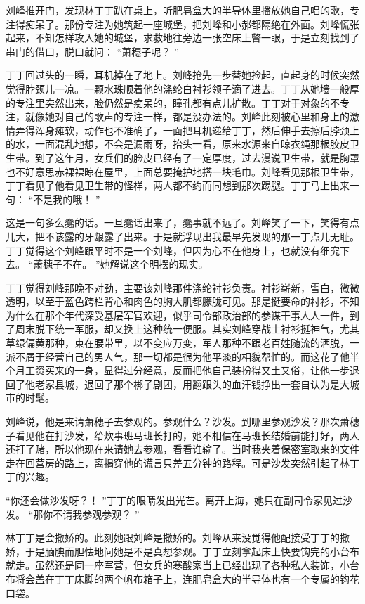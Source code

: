 \documentclass[12pt,twoside,openany]{book}
\begin{document}
刘峰推开门，发现林丁丁趴在桌上，听肥皂盒大的半导体里播放她自己唱的歌，专注得痴呆了。那份专注为她筑起一座城堡，把刘峰和小郝都隔绝在外面。刘峰慌张起来，不知怎样攻入她的城堡，求救地往旁边一张空床上瞥一眼，于是立刻找到了串门的借口，脱口就问： “萧穗子呢？ ”

丁丁回过头的一瞬，耳机掉在了地上。刘峰抢先一步替她捡起，直起身的时候突然觉得脖颈儿一凉。一颗水珠顺着他的涤纶白衬衫领子滴了进去。丁丁从她墙一般厚的专注里突然出来，脸仍然是痴呆的，瞳孔都有点儿扩散。丁丁对于对象的不专注，就像她对自己的歌声的专注一样，都是没办法的。刘峰此刻被心里和身上的激情弄得浑身瘫软，动作也不准确了，一面把耳机递给丁丁，然后伸手去擦后脖颈上的水，一面混乱地想，不会是漏雨呀，抬头一看，原来水源来自晾衣绳那根胶皮卫生带。到了这年月，女兵们的脸皮已经有了一定厚度，过去漫说卫生带，就是胸罩也不好意思赤裸裸晾在屋里，上面总要掩护地搭一块毛巾。刘峰看见那根卫生带，丁丁看见了他看见卫生带的怪样，两人都不约而同想到那次踢腿。丁丁马上出来一句： “不是我的哦！ ”

这是一句多么蠢的话。一旦蠢话出来了，蠢事就不远了。刘峰笑了一下，笑得有点儿大，把不该露的牙龈露了出来。于是就浮现出我最早先发现的那一丁点儿无耻。丁丁觉得这个刘峰跟平时不是一个刘峰，但因为心不在他身上，也就没有细究下去。 “萧穗子不在。 ”她解说这个明摆的现实。

丁丁觉得刘峰那晚不对劲，主要该刘峰那件涤纶衬衫负责。衬衫崭新，雪白，微微透明，以至于蓝色跨栏背心和肉色的胸大肌都朦胧可见。那是挺要命的衬衫，不知为什么在那个年代深受基层军官欢迎，似乎司令部政治部的参谋干事人人一件，到了周末脱下统一军服，却又换上这种统一便服。其实刘峰穿战士衬衫挺神气，尤其草绿偏黄那种，束在腰带里，以不变应万变，军人那种不跟老百姓随流的洒脱，一派不屑于经营自己的男人气，那一切都是很为他平淡的相貌帮忙的。而这花了他半个月工资买来的一身，显得过分经意，反而把他自己装扮得又土又俗，让他一步退回了他老家县城，退回了那个梆子剧团，用翻跟头的血汗钱挣出一套自认为是大城市的时髦。

刘峰说，他是来请萧穗子去参观的。参观什么？沙发。到哪里参观沙发？那次萧穗子看见他在打沙发，给炊事班马班长打的，她不相信在马班长结婚前能打好，两人还打了赌，所以他现在来请她去参观，看看谁输了。当时我夹着保密室取来的文件走在回营房的路上，离揭穿他的谎言只差五分钟的路程。可是沙发突然引起了林丁丁的兴趣。

“你还会做沙发呀？！ ”丁丁的眼睛发出光芒。离开上海，她只在副司令家见过沙发。 “那你不请我参观参观？ ”

林丁丁是会撒娇的。此刻她跟刘峰是撒娇的。刘峰从来没觉得他配接受丁丁的撒娇，于是腼腆而胆怯地问她是不是真想参观。丁丁立刻拿起床上快要钩完的小台布就走。虽然还是同一座军营，但女兵的寒酸家当上已经出现了各种私人装饰，小台布将会盖在丁丁床脚的两个帆布箱子上，连肥皂盒大的半导体也有一个专属的钩花口袋。
\end{document}
